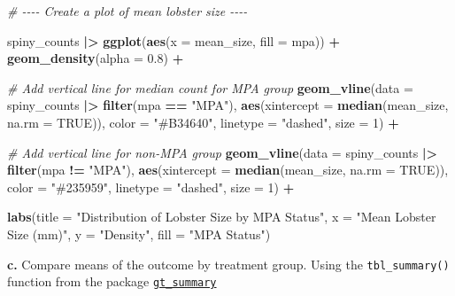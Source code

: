 \documentclass[
]{article}
\newenvironment{Shaded}{\begin{snugshade}}{\end{snugshade}}
\newcommand{\AttributeTok}[1]{\textcolor[rgb]{0.13,0.29,0.53}{#1}}
\newcommand{\CommentTok}[1]{\textcolor[rgb]{0.56,0.35,0.01}{\textit{#1}}}
\newcommand{\ConstantTok}[1]{\textcolor[rgb]{0.56,0.35,0.01}{#1}}
\newcommand{\DecValTok}[1]{\textcolor[rgb]{0.00,0.00,0.81}{#1}}
\newcommand{\FloatTok}[1]{\textcolor[rgb]{0.00,0.00,0.81}{#1}}
\newcommand{\FunctionTok}[1]{\textcolor[rgb]{0.13,0.29,0.53}{\textbf{#1}}}
\newcommand{\NormalTok}[1]{#1}
\newcommand{\SpecialCharTok}[1]{\textcolor[rgb]{0.81,0.36,0.00}{\textbf{#1}}}
\newcommand{\StringTok}[1]{\textcolor[rgb]{0.31,0.60,0.02}{#1}}
\begin{document}
\begin{Shaded}
\begin{Highlighting}[]
\CommentTok{\# {-}{-}{-}{-} Create a plot of mean lobster size {-}{-}{-}{-}}

\NormalTok{spiny\_counts }\SpecialCharTok{|\textgreater{}}
    \FunctionTok{ggplot}\NormalTok{(}\FunctionTok{aes}\NormalTok{(}\AttributeTok{x =}\NormalTok{ mean\_size, }\AttributeTok{fill =}\NormalTok{ mpa)) }\SpecialCharTok{+}
    \FunctionTok{geom\_density}\NormalTok{(}\AttributeTok{alpha =} \FloatTok{0.8}\NormalTok{) }\SpecialCharTok{+} 
    
    \CommentTok{\# Add vertical line for median count for MPA group}
     \FunctionTok{geom\_vline}\NormalTok{(}\AttributeTok{data =}\NormalTok{ spiny\_counts }\SpecialCharTok{|\textgreater{}} \FunctionTok{filter}\NormalTok{(mpa }\SpecialCharTok{==} \StringTok{"MPA"}\NormalTok{),}
                \FunctionTok{aes}\NormalTok{(}\AttributeTok{xintercept =} \FunctionTok{median}\NormalTok{(mean\_size, }\AttributeTok{na.rm =} \ConstantTok{TRUE}\NormalTok{)), }
             \AttributeTok{color =} \StringTok{"\#B34640"}\NormalTok{, }
             \AttributeTok{linetype =} \StringTok{"dashed"}\NormalTok{, }
             \AttributeTok{size =} \DecValTok{1}\NormalTok{) }\SpecialCharTok{+}
    
    \CommentTok{\# Add vertical line for non{-}MPA group}
    \FunctionTok{geom\_vline}\NormalTok{(}\AttributeTok{data =}\NormalTok{ spiny\_counts }\SpecialCharTok{|\textgreater{}} \FunctionTok{filter}\NormalTok{(mpa }\SpecialCharTok{!=} \StringTok{"MPA"}\NormalTok{), }\FunctionTok{aes}\NormalTok{(}\AttributeTok{xintercept =} \FunctionTok{median}\NormalTok{(mean\_size, }\AttributeTok{na.rm =} \ConstantTok{TRUE}\NormalTok{)), }
             \AttributeTok{color =} \StringTok{"\#235959"}\NormalTok{, }
             \AttributeTok{linetype =} \StringTok{"dashed"}\NormalTok{, }
             \AttributeTok{size =} \DecValTok{1}\NormalTok{) }\SpecialCharTok{+}
    
    \FunctionTok{labs}\NormalTok{(}\AttributeTok{title =} \StringTok{"Distribution of Lobster Size by MPA Status"}\NormalTok{,}
         \AttributeTok{x =} \StringTok{"Mean Lobster Size (mm)"}\NormalTok{,}
         \AttributeTok{y =} \StringTok{"Density"}\NormalTok{,}
         \AttributeTok{fill =} \StringTok{"MPA Status"}\NormalTok{) }
\end{Highlighting}
\end{Shaded}

\textbf{c.} Compare means of the outcome by treatment group. Using the
\texttt{tbl\_summary()} function from the package
\href{https://www.danieldsjoberg.com/gtsummary/articles/tbl_summary.html}{\texttt{gt\_summary}}
\end{document}
